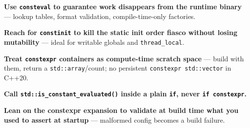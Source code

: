 \textbf{Use \texttt{consteval} to guarantee work disappears from the runtime binary} --- lookup tables, format validation, compile-time-only factories.

\textbf{Reach for \texttt{constinit} to kill the static init order fiasco without losing mutability} --- ideal for writable globals and \texttt{thread\_local}.

\textbf{Treat \texttt{constexpr} containers as compute-time scratch space} --- build with them, return a \texttt{std::array}/count; no persistent \texttt{constexpr std::vector} in C++20.

\textbf{Call \texttt{std::is\_constant\_evaluated()} inside a plain \texttt{if}, never \texttt{if constexpr}.}

\textbf{Lean on the constexpr expansion to validate at build time what you used to assert at startup} --- malformed config becomes a build failure.
